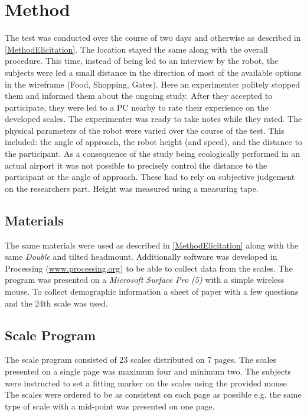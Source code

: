 \section{Method}
\label{Method2}
The test was conducted over the course of two days and otherwise as described in \autoref{MethodElicitation}. The location stayed the same along with the overall procedure. This time, instead of being led to an interview by the robot, the subjects were led a small distance in the direction of most of the available options in the wireframe (Food, Shopping, Gates). Here an experimenter politely stopped them and informed them about the ongoing study. After they accepted to participate, they were led to a PC nearby to rate their experience on the developed scales. The experimenter was ready to take notes while they rated. The physical parameters of the robot were varied over the course of the test. This included: the angle of approach, the robot height (and speed), and the distance to the participant. As a consequence of the study being ecologically performed in an actual airport it was not possible to precisely control the distance to the participant or the angle of approach. These had to rely on subjective judgement on the researchers part. Height was measured using a measuring tape.

\subsection{Materials}
The same materials were used as described in \autoref{MethodElicitation} along with the same \textit{Double} and tilted headmount. Additionally software was developed in Processing (\url{www.processing.org}) to be able to collect data from the scales. The program was presented on a \textit{Microsoft Surface Pro (5)} with a simple wireless mouse. To collect demographic information a sheet of paper with a few questions and the 24th scale was used.

\subsection{Scale Program}
The scale program consisted of 23 scales distributed on 7 pages. The scales presented on a single page was maximum four and minimum two. The subjects were instructed to set a fitting marker on the scales using the provided mouse. The scales were ordered to be as consistent on each page as possible e.g. the same type of scale with a mid-point was presented on one page.

